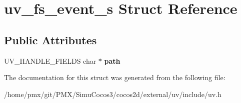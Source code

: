 \hypertarget{structuv__fs__event__s}{}\section{uv\+\_\+fs\+\_\+event\+\_\+s Struct Reference}
\label{structuv__fs__event__s}
\subsection*{Public Attributes}
\begin{DoxyCompactItemize}
\item 
\mbox{\label{structuv__fs__event__s_a0f8b11773b3b20884e9871b9a4824500}} 
U\+V\+\_\+\+H\+A\+N\+D\+L\+E\+\_\+\+F\+I\+E\+L\+DS char $\ast$ {\bfseries path}
\end{DoxyCompactItemize}


The documentation for this struct was generated from the following file\+:\begin{DoxyCompactItemize}
\item 
/home/pmx/git/\+P\+M\+X/\+Simu\+Cocos3/cocos2d/external/uv/include/uv.\+h\end{DoxyCompactItemize}
